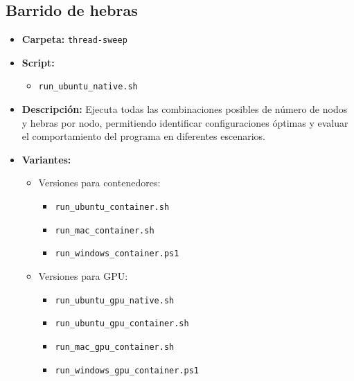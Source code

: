 \subsection{Barrido de hebras}
\begin{itemize}
    \item \textbf{Carpeta:} \texttt{thread-sweep}
    \item \textbf{Script:}
          \begin{itemize}
              \item \texttt{run\_ubuntu\_native.sh}
          \end{itemize}
    \item \textbf{Descripción:} Ejecuta todas las combinaciones posibles de número de nodos y hebras por nodo, permitiendo identificar configuraciones óptimas y evaluar el comportamiento del programa en diferentes escenarios.
    \item \textbf{Variantes:}
          \begin{itemize}
              \item Versiones para contenedores:
                    \begin{itemize}
                        \item \texttt{run\_ubuntu\_container.sh}
                        \item \texttt{run\_mac\_container.sh}
                        \item \texttt{run\_windows\_container.ps1}
                    \end{itemize}
              \item Versiones para GPU:
                    \begin{itemize}
                        \item \texttt{run\_ubuntu\_gpu\_native.sh}
                        \item \texttt{run\_ubuntu\_gpu\_container.sh}
                        \item \texttt{run\_mac\_gpu\_container.sh}
                        \item \texttt{run\_windows\_gpu\_container.ps1}
                    \end{itemize}
          \end{itemize}
\end{itemize}

